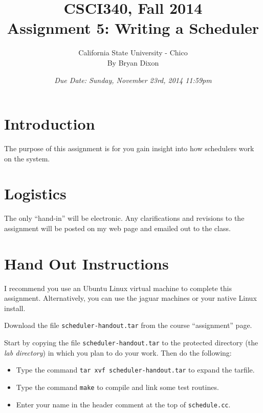 \documentclass[11pt]{article}
\begin{document}
\title{CSCI340, Fall 2014\\
Assignment 5: Writing a Scheduler
}

\author{California State University - Chico\\
  By Bryan Dixon\\
}
\date{\emph{Due Date: Sunday, November 23rd, 2014 11:59pm}}


\maketitle

\section*{Introduction}
The purpose of this assignment is for you gain insight into how schedulers work on the system. 

\section*{Logistics}

The only ``hand-in'' will be
electronic.  Any clarifications and revisions to the assignment will
be posted on my web page and emailed out to the class.

\section*{Hand Out Instructions}

I recommend you use an Ubuntu Linux virtual machine to complete this
assignment.  Alternatively, you can use the jaguar machines or your native Linux install. 

Download the file \texttt{scheduler-handout.tar} from the course
``assignment'' page.

Start by copying the file {\tt scheduler-handout.tar}
to the protected directory (the {\em lab directory}) in which you plan
to do your work.  Then do the following:

\begin{itemize}
\item Type the command {\tt tar xvf scheduler-handout.tar} 
to expand the tarfile.

\item Type the command {\tt make} to compile and link some
test routines.

\item Enter your name in the header
comment at the top of {\tt schedule.cc}.

\end{itemize}
\end{document}
